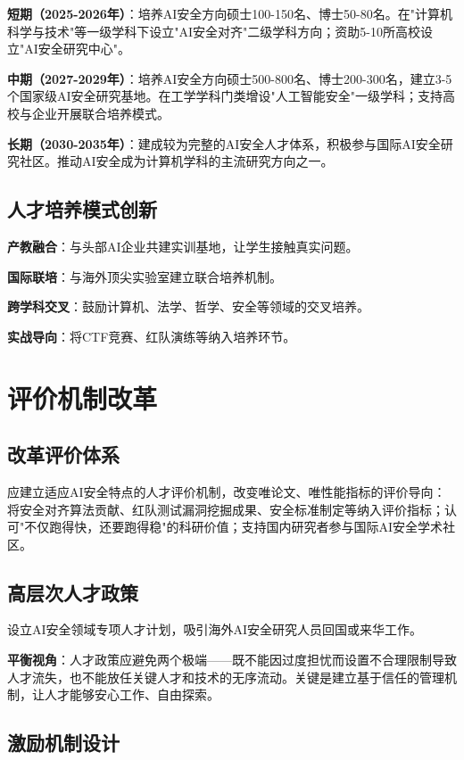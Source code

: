 \textbf{短期（2025-2026年）}：培养AI安全方向硕士100-150名、博士50-80名。在"计算机科学与技术"等一级学科下设立"AI安全对齐"二级学科方向；资助5-10所高校设立"AI安全研究中心"。

\textbf{中期（2027-2029年）}：培养AI安全方向硕士500-800名、博士200-300名，建立3-5个国家级AI安全研究基地。在工学学科门类增设"人工智能安全"一级学科；支持高校与企业开展联合培养模式。

\textbf{长期（2030-2035年）}：建成较为完整的AI安全人才体系，积极参与国际AI安全研究社区。推动AI安全成为计算机学科的主流研究方向之一。

\subsection{人才培养模式创新}

\textbf{产教融合}：与头部AI企业共建实训基地，让学生接触真实问题。

\textbf{国际联培}：与海外顶尖实验室建立联合培养机制。

\textbf{跨学科交叉}：鼓励计算机、法学、哲学、安全等领域的交叉培养。

\textbf{实战导向}：将CTF竞赛、红队演练等纳入培养环节。

\section{评价机制改革}

\subsection{改革评价体系}

应建立适应AI安全特点的人才评价机制，改变唯论文、唯性能指标的评价导向：
将安全对齐算法贡献、红队测试漏洞挖掘成果、安全标准制定等纳入评价指标；认可"不仅跑得快，还要跑得稳"的科研价值；支持国内研究者参与国际AI安全学术社区。

\subsection{高层次人才政策}

设立AI安全领域专项人才计划，吸引海外AI安全研究人员回国或来华工作。

\textbf{平衡视角}：人才政策应避免两个极端——既不能因过度担忧而设置不合理限制导致人才流失，也不能放任关键人才和技术的无序流动。关键是建立基于信任的管理机制，让人才能够安心工作、自由探索。

\subsection{激励机制设计}

